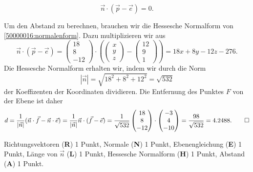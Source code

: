 \begin{loesung}
\begin{teilaufgaben}
\begin{equation}
\vec{n}\cdot (\vec{p}-\vec{e})=0.
\label{50000015:normalenform}
\end{equation}
\item
Um den Abstand zu berechnen, brauchen wir die Hessesche Normalform
von \eqref{50000016:normalenform}.
Dazu multiplizieren wir aus
\[
\vec{n}\cdot (\vec{p}-\vec{e})
=
\begin{pmatrix} 18\\8\\-12 \end{pmatrix}
\cdot\left(
\begin{pmatrix}x\\y\\z\end{pmatrix}
-
\begin{pmatrix}12\\9\\1\end{pmatrix}
\right)
=
18x+8y-12z-276.
\]
Die Hessesche Normalform erhalten wir, indem wir durch die Norm
\[
|\vec{n}|
=
\sqrt{18^2+8^2+12^2}
=
\sqrt{532}
\]
der Koeffizenten der Koordinaten dividieren.
Die Entfernung des Punktes $F$ von der Ebene ist daher
\[
d
=
\frac{1}{|\vec{n}|}
(\vec{n}\cdot\vec{f}-\vec{n}\cdot\vec{e})
=
\frac{1}{|\vec{n}|}
\vec{n}\cdot(\vec{f}-\vec{e})
=
\frac1{\sqrt{532}}
\begin{pmatrix}18\\8\\-12\end{pmatrix}
\cdot
\begin{pmatrix}-3\\4\\-10\end{pmatrix}
=
\frac{98}{\sqrt{532}}
=
4.2488.
\qedhere
\]
\end{teilaufgaben}
\end{loesung}

\begin{bewertung}
Richtungsvektoren ({\bf R}) 1 Punkt,
Normale ({\bf N}) 1 Punkt,
Ebenengleichung ({\bf E}) 1 Punkt,
Länge von $\vec{n}$ ({\bf L}) 1 Punkt,
Hessesche Normalform ({\bf H}) 1 Punkt,
Abstand ({\bf A}) 1 Punkt.
\end{bewertung}


